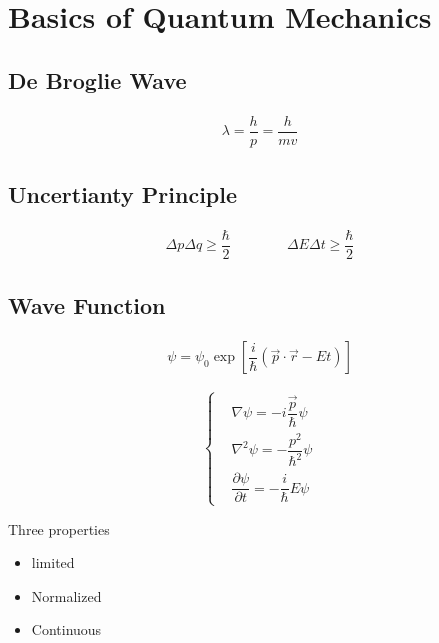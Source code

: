 \chapter{Basics of Quantum Mechanics}

\section{De Broglie Wave}

\begin{equation}
  \begin{aligned}
    \lambda = \dfrac{h}{p} = \dfrac{h}{m v} 
  \end{aligned}
\end{equation}

\section{Uncertianty Principle}

\begin{equation}
  \begin{aligned}
    \Delta p \Delta q \geq \dfrac{\hbar}{2} 
    \quad\quad\quad\quad
    \Delta E \Delta t \geq \dfrac{\hbar}{2} 
  \end{aligned}
\end{equation}

\section{Wave Function}

\begin{equation}
  \begin{aligned}
    \psi = \psi_0 \exp \left[ \dfrac{i}{\hbar} \left( \vec{p} \cdot \vec{r} - E t \right)  \right]
  \end{aligned}
\end{equation}

\begin{equation}
  \left\{
  \begin{aligned}
    & \nabla \psi = - i \dfrac{\vec{p}}{\hbar} \psi \\  
    & \nabla^2 \psi = - \dfrac{p^2}{\hbar^2} \psi \\  
    & \dfrac{\partial \psi}{\partial t} = - \dfrac{i}{\hbar} E \psi  
  \end{aligned}
  \right.
\end{equation}

Three properties

\begin{itemize}
\item limited
\item Normalized
\item Continuous
\end{itemize}


